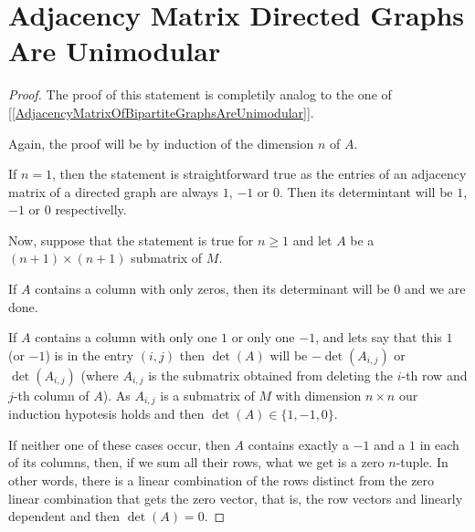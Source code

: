 ﻿\chapter{Adjacency Matrix Directed Graphs Are Unimodular}


\begin{proof}
    The proof of this statement is completily analog to the one of [\ref{AdjacencyMatrixOfBipartiteGraphsAreUnimodular}].\pn
    
    Again, the proof will be by induction of the dimension $n$ of $A$.\pn
    
    If $n=1$, then the statement is straightforward true as the entries of an adjacency matrix of a directed graph are always
    $1$, $-1$ or $0$. Then its determintant will be $1$, $-1$ or $0$ respectivelly.\pn
    
    Now, suppose that the statement is true for $n \geq 1$ and let $A$ be a $(n+1) \times (n+1)$ submatrix of $M$.\pn
    
    If $A$ contains a column with only zeros, then its determinant will be $0$ and we are done.\pn
    
    If $A$ contains a column with only one $1$ or only one $-1$, and lets say that this $1$ (or $-1$) is in the entry $(i,j)$
    then $\det(A)$ will be $-\det(A_{i,j})$ or $\det(A_{i,j})$ (where $A_{i,j}$ is the submatrix obtained from deleting the 
    $i$-th row and $j$-th column of $A$). As $A_{i,j}$ is a submatrix of $M$ with dimension $n \times n$ our induction hypotesis holds
    and then $\det(A) \in \{1, -1, 0\}$.\pn
    
    If neither one of these cases occur, then $A$ contains exactly a $-1$ and a $1$ in each of its columns, then, if we
    sum all their rows, what we get is a zero $n$-tuple. In other words, there is a linear combination of the rows distinct from the
    zero linear combination that gets the zero vector, that is, the row vectors and linearly dependent and then $\det(A) = 0$.
\end{proof}